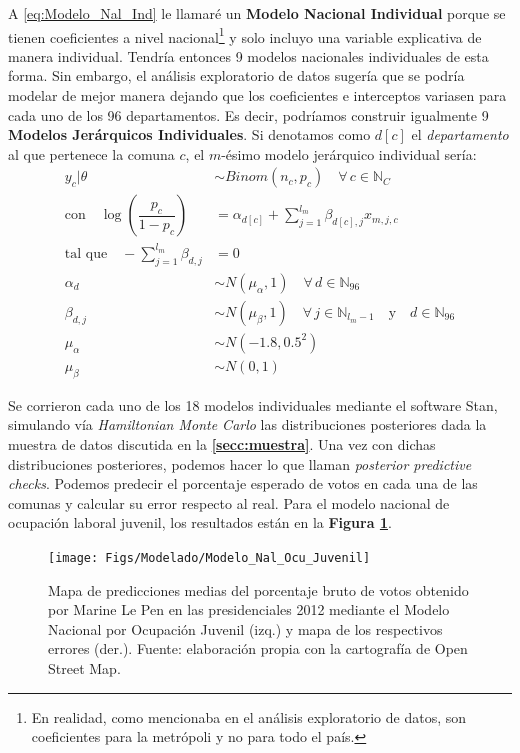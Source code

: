 A \eqref{eq:Modelo_Nal_Ind} le llamaré un \textbf{Modelo Nacional Individual} porque se tienen coeficientes a nivel nacional\footnote{En realidad, como mencionaba en el análisis exploratorio de datos, son coeficientes para la metrópoli y no para todo el país.} y solo incluyo una variable explicativa de manera individual. Tendría entonces 9 modelos nacionales individuales de esta forma. Sin embargo, el análisis exploratorio de datos sugería que se podría modelar de mejor manera dejando que los coeficientes e interceptos variasen para cada uno de los 96 departamentos. Es decir, podríamos construir igualmente 9 \textbf{Modelos Jerárquicos Individuales}. Si denotamos como $d[c]$ el \textit{departamento} al que pertenece la comuna $c$, el $m$-ésimo modelo jerárquico individual sería: 
\begin{align}\label{eq:Modelo_Jer_Ind}
y_c|\theta & \sim Binom(n_c,p_c) \quad \forall \, c \in \mathbb{N}_C \nonumber \\
\text{con} \quad \log\left(\dfrac{p_c}{1-p_c}\right) &= \alpha_{d[c]} + \sum\limits_{j=1}^{l_m} \beta_{d[c],j} x_{m,j,c} \nonumber\\ 
\text{tal que} \quad -\sum\limits_{j = 1}^{l_m} \beta_{d,j} &= 0 \nonumber \\
\alpha_d & \sim N(\mu_{\alpha}, 1) \quad \forall \, d \in \mathbb{N}_{96} \nonumber \\
\beta_{d,j} & \sim N(\mu_{\beta}, 1) \quad \forall \, j \in \mathbb{N}_{l_m-1}  \quad \text{y} \quad d \in \mathbb{N}_{96} \nonumber \\
\mu_{\alpha} &\sim N(-1.8, 0.5^2) \nonumber \\
\mu_{\beta} &\sim N(0,1)
\end{align}

Se corrieron cada uno de los 18 modelos individuales mediante el software Stan, simulando vía \textit{Hamiltonian Monte Carlo} las distribuciones posteriores dada la muestra de datos discutida en la \textbf{\autoref{secc:muestra}}. Una vez con dichas distribuciones posteriores, podemos hacer lo que \textcite{Gelman13} llaman \textit{posterior predictive checks}. Podemos predecir el porcentaje esperado de votos en cada una de las comunas y calcular su error respecto al real. Para el modelo nacional de ocupación laboral juvenil, los resultados están en la \textbf{Figura \ref{fig:Modelo_Nal_Ocu_Juvenil}}.\\

\begin{figure}
	\centering
	\texttt{[image: Figs/Modelado/Modelo\_Nal\_Ocu\_Juvenil]}
	\caption{Mapa de predicciones medias del porcentaje bruto de votos obtenido por Marine Le Pen en las presidenciales 2012 mediante el Modelo Nacional por Ocupación Juvenil (izq.) y mapa de los respectivos errores (der.). Fuente: elaboración propia con la cartografía de Open Street Map.}
	\label{fig:Modelo_Nal_Ocu_Juvenil}
\end{figure}

